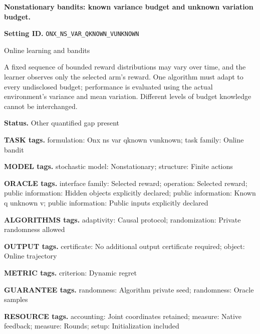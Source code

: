 \documentclass[10pt,a4paper]{article}
\begin{document}
\raggedright

{\LARGE\bfseries\sffamily\color{AtlasNavy} Nonstationary bandits: known variance budget and unknown variation budget.\par}\vspace{5pt}


\textbf{Setting ID.} \texttt{ONX\_\allowbreak{}NS\_\allowbreak{}VAR\_\allowbreak{}QKNOWN\_\allowbreak{}VUNKNOWN}



Online learning and bandits



A fixed sequence of bounded reward distributions may vary over time, and the learner observes only the selected arm's reward. One algorithm must adapt to every undisclosed budget; performance is evaluated using the actual environment's variance and mean variation. Different levels of budget knowledge cannot be interchanged.



\textbf{Status.} Other quantified gap present



\textbf{TASK tags.} formulation: Onx ns var qknown vunknown; task family: Online bandit



\textbf{MODEL tags.} stochastic model: Nonstationary; structure: Finite actions



\textbf{ORACLE tags.} interface family: Selected reward; operation: Selected reward; public information: Hidden objects explicitly declared; public information: Known q unknown v; public information: Public inputs explicitly declared



\textbf{ALGORITHMS tags.} adaptivity: Causal protocol; randomization: Private randomness allowed



\textbf{OUTPUT tags.} certificate: No additional output certificate required; object: Online trajectory



\textbf{METRIC tags.} criterion: Dynamic regret



\textbf{GUARANTEE tags.} randomness: Algorithm private seed; randomness: Oracle samples



\textbf{RESOURCE tags.} accounting: Joint coordinates retained; measure: Native feedback; measure: Rounds; setup: Initialization included
\end{document}
